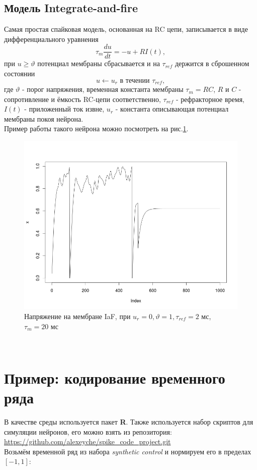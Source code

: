 \documentclass[a4paper,10pt,usenames]{article}
\begin{document}
\subsection{Модель Integrate-and-fire}
\indent Самая простая спайковая модель, основанная на RC цепи, записывается в виде дифференциального уравнения
   \begin{equation}\label{eq:iaf}
   \tau_{m}\frac{du}{dt} =-u+R I(t),
   \end{equation}
при $u \geq \vartheta$ потенциал мембраны сбрасывается и на $\tau_{ref}$ держится в сброшенном состоянии
   \begin{equation}\label{eq:iaf_reset}
   u \leftarrow u_{r} \mbox{ в течении }\tau_{ref}, 
   \end{equation}
   где $\vartheta$ - порог напряжения, временная константа мембраны $\tau_{m}=RC$, $R$ и $C$ - сопротивление и ёмкость RC-цепи соответственно, $\tau_{ref}$ - рефракторное время, $I(t)$ - приложенный ток извне, $u_{r}$ - константа описывающая потенциал мембраны покоя нейрона.\\
   \indent Пример работы такого нейрона можно посмотреть на рис.\ref{iaf_neuron_pic}.\\
\begin{figure}[ht]
\centering
\captionsetup{justification=centering,margin=1cm}
\includegraphics[width=120mm,scale=1]{iaf_profile.png}
\caption{Напряжение на мембране IaF, при $u_{r} = 0, \vartheta = 1, \tau_{ref} = 2$ мс, $\tau_{m} = 20$ мс}
\label{iaf_neuron_pic}
\end{figure}\\

\section{Пример: кодирование временного ряда}
\indent В качестве среды используется пакет \textbf{R}. Также используется набор скриптов для симуляции нейронов, его можно взять из репозитория:\\ 
\url{https://github.com/alexeyche/spike_code_project.git} \\ 
\indent Возьмём временной ряд из набора \textit{synthetic control} и нормируем его в пределах $[-1,1]$:
\end{document}
